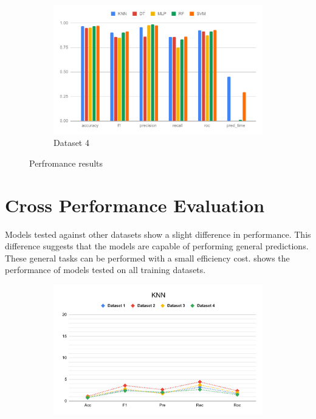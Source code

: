 \begin{figure}
  \ContinuedFloat
  \begin{subfigure}{.9\columnwidth}
    \centering
    \includegraphics[width=0.9\columnwidth]{media/data/performance/perf_ds_4.pdf}
    \caption{Dataset 4}
    \label{fig:perfromance_results_dataset_4}
  \end{subfigure}
  \caption{Perfromance results}
  \label{fig:perfromance_results}
\end{figure}

\FloatBarrier
\section{Cross Performance Evaluation} \label{sec:cross_performance_evaluation}

Models tested against other datasets show a slight difference in performance. This difference suggests that the models are capable of performing general predictions. These general tasks can be performed with a small efficiency cost.  shows the performance of models tested on all training datasets.

\begin{figure}[H]
  \centering
  \begin{subfigure}{.9\columnwidth}
    \centering
    \includegraphics[width=0.9\columnwidth]{media/data/performance_delta/delta_KNN.pdf}
    \caption{}
    \label{fig:perfromance_delta_knn}
  \end{subfigure}%
\end{figure}
  
